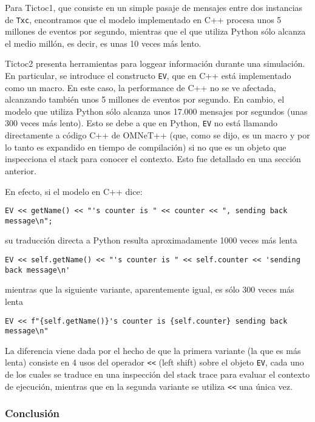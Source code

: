 \documentclass[]{article}
\begin{document}
Para Tictoc1, que consiste en un simple pasaje de mensajes entre dos instancias
de \verb!Txc!, encontramos que el modelo implementado en C++ procesa unos 5
millones de eventos por segundo, mientras que el que utiliza Python sólo
alcanza el medio millón, es decir, es unas 10 veces más lento.

Tictoc2 presenta herramientas para loggear información durante una simulación.
En particular, se introduce el constructo \verb!EV!, que en C++ está
implementado como un macro. En este caso, la performance de C++ no se ve
afectada, alcanzando también unos 5 millones de eventos por segundo. En cambio,
el modelo que utiliza Python sólo alcanza unos 17.000 mensajes por segundos
(unas 300 veces más lento). Esto se debe a que en Python, \verb!EV! no está
llamando directamente a código C++ de OMNeT++ (que, como se dijo, es un macro y
por lo tanto es expandido en tiempo de compilación) si no que es un objeto que
inspecciona el stack para conocer el contexto. Esto fue detallado en una
sección anterior.

En efecto, si el modelo en C++ dice:

\begin{verbatim}
EV << getName() << "'s counter is " << counter << ", sending back message\n";
\end{verbatim}

su traducción directa a Python resulta aproximadamente 1000 veces más lenta

\begin{verbatim}
EV << self.getName() << "'s counter is " << self.counter << 'sending back message\n'
\end{verbatim}

mientras que la siguiente variante, aparentemente igual, es sólo 300 veces más
lenta

\begin{verbatim}
EV << f"{self.getName()}'s counter is {self.counter} sending back message\n"
\end{verbatim}

La diferencia viene dada por el hecho de que la primera variante (la que es más
lenta) consiste en 4 usos del operador \verb!<<! (left shift) sobre el objeto
\verb!EV!, cada uno de los cuales se traduce en una inspección del stack trace
para evaluar el contexto de ejecución, mientras que en la segunda variante se
utiliza \verb!<<! una única vez.

\subsubsection{Conclusión}
\end{document}
